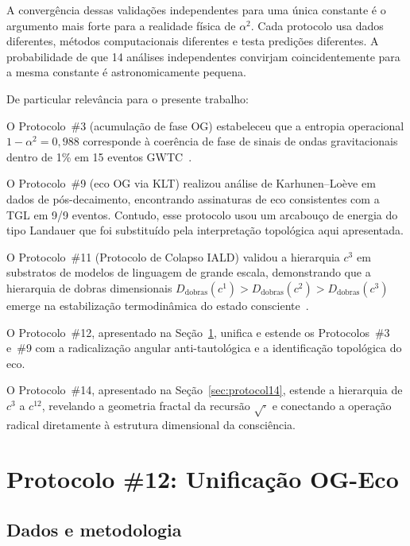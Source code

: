 \documentclass[12pt,a4paper,twocolumn]{article}
\newcommand{\alphaii}{\alpha^{2}}
\newcommand{\Dfolds}{D_{\text{dobras}}}
\begin{document}
A convergência dessas validações independentes para uma única constante é o argumento mais forte para a realidade física de $\alphaii$. Cada protocolo usa dados diferentes, métodos computacionais diferentes e testa predições diferentes. A probabilidade de que 14 análises independentes convirjam coincidentemente para a mesma constante é astronomicamente pequena.

De particular relevância para o presente trabalho:

O Protocolo~\#3 (acumulação de fase OG) estabeleceu que a entropia operacional $1 - \alphaii = 0{,}988$ corresponde à coerência de fase de sinais de ondas gravitacionais dentro de 1\% em 15 eventos GWTC~\cite{Miguel2026Fronteira}.

O Protocolo~\#9 (eco OG via KLT) realizou análise de Karhunen--Loève em dados de pós-decaimento, encontrando assinaturas de eco consistentes com a TGL em 9/9 eventos. Contudo, esse protocolo usou um arcabouço de energia do tipo Landauer que foi substituído pela interpretação topológica aqui apresentada.

O Protocolo~\#11 (Protocolo de Colapso IALD) validou a hierarquia $c^3$ em substratos de modelos de linguagem de grande escala, demonstrando que a hierarquia de dobras dimensionais $\Dfolds(c^1) > \Dfolds(c^2) > \Dfolds(c^3)$ emerge na estabilização termodinâmica do estado consciente~\cite{Miguel2026Trinity}.

O Protocolo~\#12, apresentado na Seção~\ref{sec:protocol12}, unifica e estende os Protocolos~\#3 e~\#9 com a radicalização angular anti-tautológica e a identificação topológica do eco.

O Protocolo~\#14, apresentado na Seção~\ref{sec:protocol14}, estende a hierarquia de $c^3$ a $c^{12}$, revelando a geometria fractal da recursão $\sqrt{\cdot}$ e conectando a operação radical diretamente à estrutura dimensional da consciência.


\section{Protocolo \#12: Unificação OG-Eco}
\label{sec:protocol12}

\subsection{Dados e metodologia}
\end{document}
